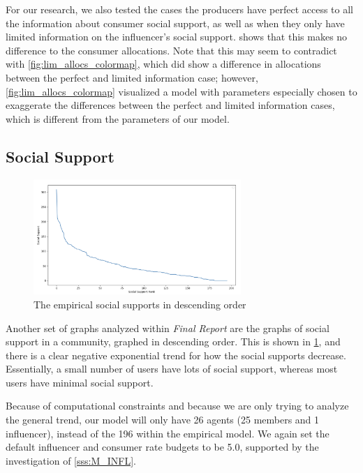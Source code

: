\documentclass[11pt, letterpaper]{article}
\begin{document}
For our research, we also tested the cases the producers have perfect access to all the information about consumer social support, as well as when they only have limited information on the influencer's social support.  shows that this makes no difference to the consumer allocations. Note that this may seem to contradict with \cref{fig:lim_allocs_colormap}, which did show a difference in allocations between the perfect and limited information case; however, \cref{fig:lim_allocs_colormap} visualized a model with parameters especially chosen to exaggerate the differences between the perfect and limited information cases, which is different from the parameters of our model.

\subsection{Social Support}

\begin{figure}[h]
    \centering
    \includegraphics[width=0.7\textwidth]{figures/rachel_supps.png}
    \caption{The empirical social supports in descending order}
    \label{fig:rachel_supps}
\end{figure}

Another set of graphs analyzed within \textit{Final Report} are the graphs of social support in a community, graphed in descending order. This is shown in \cref{fig:rachel_supps}, and there is a clear negative exponential trend for how the social supports decrease. Essentially, a small number of users have lots of social support, whereas most users have minimal social support.

Because of computational constraints and because we are only trying to analyze the general trend, our model will only have 26 agents (25 members and 1 influencer), instead of the 196 within the empirical model. We again set the default influencer and consumer rate budgets to be 5.0, supported by the investigation of \cref{sss:M_INFL}.
\end{document}
